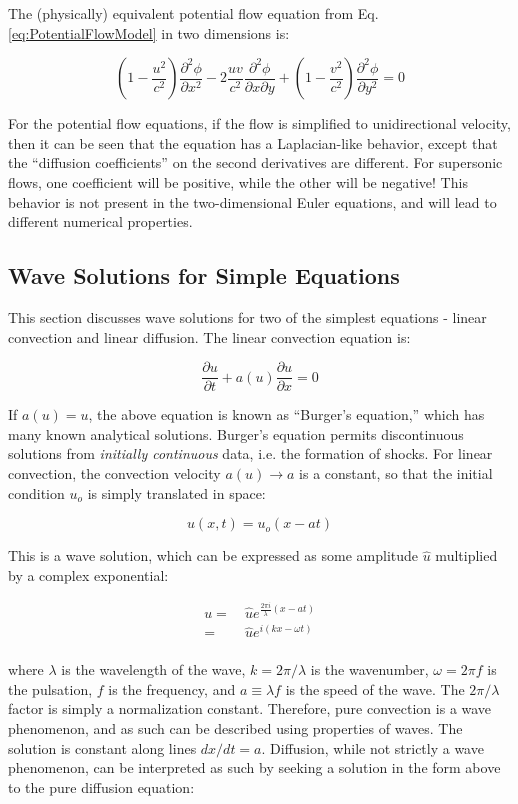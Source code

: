 \documentclass[10pt]{article}
\newcommand{\beq}{\begin{equation}}
\newcommand{\eeq}{\end{equation}}
\newcommand{\beqa}{\begin{equation}\begin{aligned}}
\newcommand{\eeqa}{\end{aligned}\end{equation}}
\begin{document}
\begin{flushleft}
The (physically) equivalent potential flow equation from Eq. \eqref{eq:PotentialFlowModel} in two dimensions is:

\beq
\left(1-\frac{u^2}{c^2}\right)\frac{\partial^2\phi}{\partial x^2}-2\frac{uv}{c^2}\frac{\partial^2\phi}{\partial x\partial y}+\left(1-\frac{v^2}{c^2}\right)\frac{\partial^2\phi}{\partial y^2}=0
\eeq

For the potential flow equations, if the flow is simplified to unidirectional velocity, then it can be seen that the equation has a Laplacian-like behavior, except that the ``diffusion coefficients'' on the second derivatives are different. For supersonic flows, one coefficient will be positive, while the other will be negative! This behavior is not present in the two-dimensional Euler equations, and will lead to different numerical properties.

\subsection{Wave Solutions for Simple Equations}
This section discusses wave solutions for two of the simplest equations - linear convection and linear diffusion. The linear convection equation is:

\beq
\frac{\partial u}{\partial t}+a(u)\frac{\partial u}{\partial x}=0
\eeq

If \(a(u)=u\), the above equation is known as ``Burger's equation,'' which has many known analytical solutions. Burger's equation permits discontinuous solutions from {\it initially continuous} data, i.e. the formation of shocks. For linear convection, the convection velocity \(a(u)\rightarrow a\) is a constant, so that the initial condition \(u_o\) is simply translated in space:

\beq
u(x,t)=u_o(x-at)
\eeq

This is a wave solution, which can be expressed as some amplitude \(\hat{u}\) multiplied by a complex exponential:

\beqa
\label{eq:1DWave}
u=&\ \hat{u}e^{\frac{2\pi i}{\lambda}(x-at)}\\
=&\ \hat{u}e^{i(kx-\omega t)}\\
\eeqa

where \(\lambda\) is the wavelength of the wave, \(k=2\pi/\lambda\) is the wavenumber, \(\omega=2\pi f\) is the pulsation, \(f\) is the frequency, and \(a\equiv\lambda f\) is the speed of the wave. The \(2\pi/\lambda\) factor is simply a normalization constant. Therefore, pure convection is a wave phenomenon, and as such can be described using properties of waves. The solution is constant along lines \(dx/dt=a\). Diffusion, while not strictly a wave phenomenon, can be interpreted as such by seeking a solution in the form above to the pure diffusion equation:


\end{flushleft}
\end{document}
